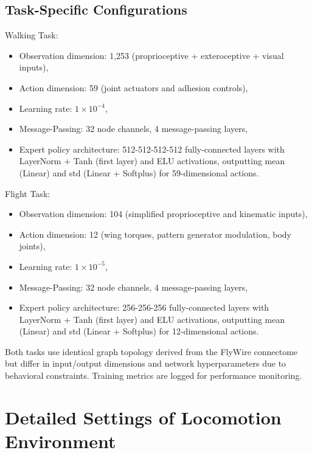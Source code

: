 \documentclass[a4paper]{easychair}
\begin{document}
\subsection{Task-Specific Configurations}
Walking Task:
\begin{itemize}
\setlength{\itemsep}{0pt}
\setlength{\parsep}{0pt}
\setlength{\parskip}{0pt}
    \item Observation dimension: 1,253 (proprioceptive + exteroceptive + visual inputs),
    \item Action dimension: 59 (joint actuators and adhesion controls),
    \item Learning rate: $1 \times 10^{-4}$,
    \item Message-Passing: 32 node channels, 4 message-passing layers,
    \item Expert policy architecture: 512-512-512-512 fully-connected layers with LayerNorm + Tanh (first layer) and ELU activations, outputting mean (Linear) and std (Linear + Softplus) for 59-dimensional actions.
\end{itemize}

Flight Task:
\begin{itemize}
\setlength{\itemsep}{0pt}
\setlength{\parsep}{0pt}
\setlength{\parskip}{0pt}
    \item Observation dimension: 104 (simplified proprioceptive and kinematic inputs),
    \item Action dimension: 12 (wing torques, pattern generator modulation, body joints),
    \item Learning rate: $1 \times 10^{-5}$,
    \item Message-Passing: 32 node channels, 4 message-passing layers,
    \item Expert policy architecture:  256-256-256 fully-connected layers with LayerNorm + Tanh (first layer) and ELU activations, outputting mean (Linear) and std (Linear + Softplus) for 12-dimensional actions.
\end{itemize}

Both tasks use identical graph topology derived from the FlyWire connectome but differ in input/output dimensions and network hyperparameters due to behavioral constraints. Training metrics are logged for performance monitoring.

\section{Detailed Settings of Locomotion Environment}
\label{app:env_details}
\end{document}
